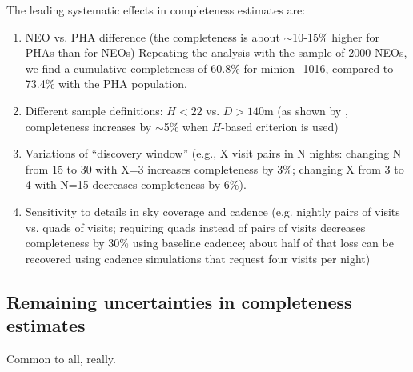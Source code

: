 The leading systematic effects in completeness estimates are: 
\begin{enumerate}
\item NEO vs. PHA difference (the completeness is about $\sim$10-15\% higher for PHAs than for NEOs) 
Repeating the analysis with the sample of 2000 NEOs, we find a cumulative completeness of 60.8\% for minion\_1016, compared to 73.4\% with the PHA population. 

\item Different sample definitions: $H<22$ vs. $D>140$m (as shown by \citep{GMS2016}, completeness increases by $\sim$5\% when $H$-based criterion is used) 
\item Variations of ``discovery window'' (e.g., X visit pairs in N nights: changing N from 15 to 30 with X=3 increases
          completeness by 3\%; changing X from 3 to 4 with N=15 decreases completeness by 6\%). 
\item Sensitivity to details in sky coverage and cadence (e.g. nightly pairs of visits vs. quads of visits;
          requiring quads instead of pairs of visits decreases completeness by 30\% using baseline cadence; 
          about half of that loss can be recovered using cadence simulations that request four visits per night) 
\end{enumerate}          
    
    
\subsection{Remaining uncertainties in completeness estimates}

Common to all, really.          

